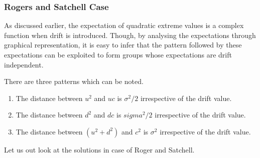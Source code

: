 \documentclass[12pt]{article}   	%
\begin{document}
\subsubsection{Rogers and Satchell Case}

As discussed earlier, the expectation of quadratic extreme values is a complex function when drift is introduced. Though, by analysing the expectations through graphical representation, it is easy to infer that the pattern followed by these expectations can be exploited to form groups whose expectations are drift independent. 

There are three patterns which can be noted.
\begin{enumerate}
\item The distance between $u^2$ and $uc$ is $\sigma^2/2$ irrespective of the drift value.
\item The distance between $d^2$ and $dc$ is $sigma^2/2$ irrespective of the drift value.
\item The distance between $(u^2+ d^2)$ and $c^2$ is $\sigma^2$  irrespective of the drift value.
\end{enumerate}
Let us out look at the solutions in case of Roger and Satchell.
\end{document}
